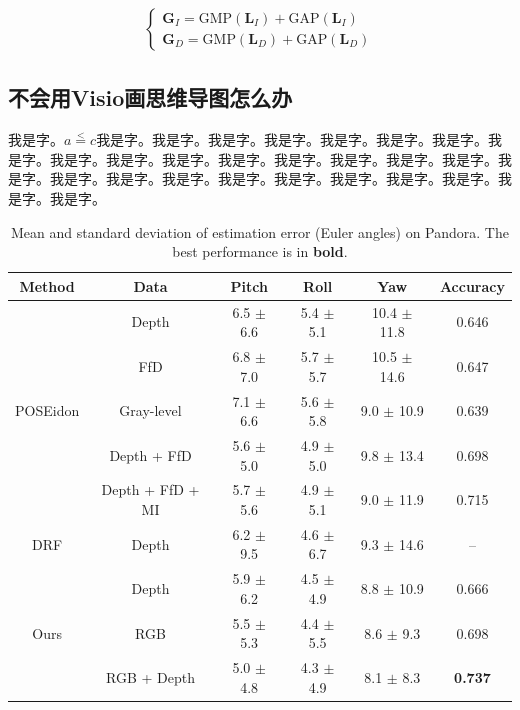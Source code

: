 \documentclass[supercite]{HustGraduPaper}
\theoremstyle{definition}
\begin{document}
\begin{eqnarray}\label{equ_GMP}
	\begin{cases}
		\textbf{G}_I=\mathrm{GMP}(\textbf{L}_I) + \mathrm{GAP}(\textbf{L}_I)\\
		\textbf{G}_D=\mathrm{GMP}(\textbf{L}_D) + \mathrm{GAP}(\textbf{L}_D)
	\end{cases}
\end{eqnarray}{}

\subsection{不会用Visio画思维导图怎么办}

我是字。$a\stackrel{<}{=}c$我是字。我是字。我是字。我是字。我是字。我是字。我是字。我是字。我是字。我是字。我是字。我是字。我是字。我是字。我是字。我是字。我是字。我是字。我是字。我是字。我是字。我是字。我是字。我是字。我是字。我是字。我是字。

\begin{table}
	\begin{center}
		\setlength{\tabcolsep}{2.0mm}
		\caption{Mean and standard deviation of estimation error (Euler angles) on Pandora. The best performance is in \textbf{bold}.}
		\label{table2}
		\begin{tabular}{c|ccccc}
			\hline
			Method    			        & Data               & Pitch         & Roll           & Yaw              & Accuracy\\
			\hline
			\hline			
			\multirow{5}{*}{POSEidon}   & Depth              & 6.5 $\pm$ 6.6  & 5.4 $\pm$ 5.1  & 10.4 $\pm$ 11.8  & 0.646\\
			                            & FfD              	 & 6.8 $\pm$ 7.0  & 5.7 $\pm$ 5.7  & 10.5 $\pm$ 14.6  & 0.647\\
			                            & Gray-level         & 7.1 $\pm$ 6.6  & 5.6 $\pm$ 5.8  & 9.0  $\pm$ 10.9  & 0.639\\
			                            & Depth + FfD	     & 5.6 $\pm$ 5.0  & 4.9 $\pm$ 5.0  & 9.8  $\pm$ 13.4  & 0.698\\
		 	                            & Depth + FfD + MI   & 5.7 $\pm$ 5.6  & 4.9 $\pm$ 5.1  & 9.0  $\pm$ 11.9  & 0.715\\
			\hline
			DRF                         & Depth              & 6.2 $\pm$ 9.5  & 4.6 $\pm$ 6.7  & 9.3  $\pm$ 14.6  & --\\
			\hline
			\multirow{3}{*}{Ours}   	& Depth              & 5.9 $\pm$ 6.2  & 4.5 $\pm$ 4.9  & 8.8  $\pm$ 10.9  & 0.666\\
			                            & RGB                & 5.5 $\pm$ 5.3  & 4.4 $\pm$ 5.5  & 8.6  $\pm$ 9.3   & 0.698\\
			                            & RGB + Depth        & 5.0 $\pm$ 4.8  & 4.3 $\pm$ 4.9  & 8.1  $\pm$ 8.3   & \textbf{0.737}\\
			\hline
		\end{tabular}
	\end{center}
\end{table}
\end{document}
